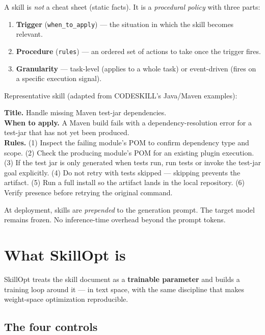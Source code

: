 \documentclass[11pt,a4paper]{article}
\begin{document}
A skill is \emph{not} a cheat sheet (static facts). It is a
\emph{procedural policy} with three parts:

\begin{enumerate}[leftmargin=1.4em]
  \item \textbf{Trigger} (\texttt{when\_to\_apply}) --- the situation in
  which the skill becomes relevant.
  \item \textbf{Procedure} (\texttt{rules}) --- an ordered set of
  actions to take once the trigger fires.
  \item \textbf{Granularity} --- task-level (applies to a whole task) or
  event-driven (fires on a specific execution signal).
\end{enumerate}

Representative skill (adapted from CODESKILL's Java/Maven examples):

\begin{keybox}
\textbf{Title.} Handle missing Maven test-jar dependencies.\\
\textbf{When to apply.} A Maven build fails with a dependency-resolution
error for a test-jar that has not yet been produced.\\
\textbf{Rules.}
(1) Inspect the failing module's POM to confirm dependency type and scope.
(2) Check the producing module's POM for an existing plugin execution.
(3) If the test jar is only generated when tests run, run tests or
invoke the test-jar goal explicitly.
(4) Do not retry with tests skipped --- skipping prevents the artifact.
(5) Run a full install so the artifact lands in the local repository.
(6) Verify presence before retrying the original command.
\end{keybox}

At deployment, skills are \emph{prepended} to the generation prompt.
The target model remains frozen. No inference-time overhead beyond the
prompt tokens.

\section{What SkillOpt is}

SkillOpt treats the skill document as a \textbf{trainable parameter}
and builds a training loop around it --- in text space, with the same
discipline that makes weight-space optimization reproducible.

\subsection{The four controls}
\end{document}
